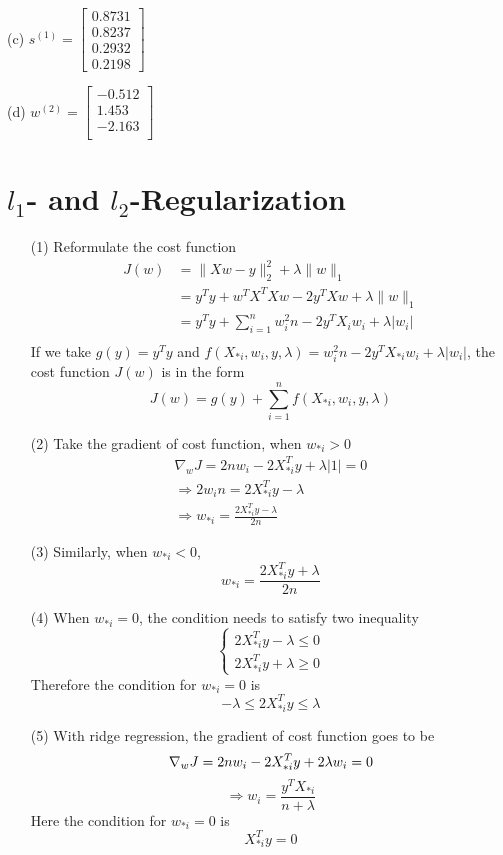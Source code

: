 \documentclass[a4paper,12pt]{article}
\begin{document}
\begin{itemize}
\subitem (c) 
$s^{(1)} = \left [ \begin{array}{c}
0.8731\\
0.8237 \\
0.2932 \\
0.2198
\end{array} \right ] $

\subitem (d) 
$w^{(2)} = \left [ \begin{array}{c}
-0.512\\
1.453 \\
-2.163 \\
\end{array} \right ] $
\end{itemize}




\clearpage
\section{$l_1$- and $l_2$-Regularization}
\begin{itemize}
\item[(1)]
Reformulate the cost function
\begin{align*}
J(w) &= \| X w - y \|_2^2 + \lambda \|w \|_1 \\
	  &= y^T y + w^T X^T X w - 2y^T X w + \lambda \|w\|_1\\
	  &= y^T y + \sum_{i=1}^n w_i^2 n - 2y^T X_i w_i + \lambda  |w_i| \\
\end{align*}
If we take $g(y) = y^T y$ and $f(X_{*i},w_i,y,\lambda) = w_i^2 n - 2y^T X_{*i} w_i + \lambda |w_i| $, the cost function $J(w)$ is in the form
$$
J(w) = g(y) + \sum_{i=1}^n f(X_{*i},w_i,y,\lambda)
$$

\clearpage
\item[(2)]
Take the gradient of cost function, when $w_{*i} > 0$
\begin{align*}
\nabla_w J = 2 n w_i - 2 X_{*i}^T y + \lambda |1| = 0 \\
\Rightarrow 2w_i n = 2 X_{*i}^T y - \lambda \\
\Rightarrow w_{*i} = \frac{2 X_{*i}^T y - \lambda}{2n}
\end{align*}

\clearpage
\item[(3)]
Similarly, when $w_{*i} < 0$, 
$$
w_{*i} = \frac{2 X_{*i}^T y + \lambda}{2n}
$$


\clearpage
\item[(4)]
When $w_{*i} = 0$, the condition needs to satisfy two inequality
$$\begin{cases}
2 X_{*i}^T y - \lambda \le 0 \\
2 X_{*i}^T y + \lambda \ge 0
\end{cases}$$
Therefore the condition for $w_{*i} = 0$ is
$$
-\lambda \le 2 X_{*i}^T y \le \lambda
$$


\clearpage
\item[(5)]
With ridge regression, the gradient of cost function goes to be
$$
\nabla_w J = 2 n w_i - 2 X_{*i}^T y + 2 \lambda w_i = 0 \\
$$
$$
\Rightarrow w_i = \frac{y^T X_{*i}}{n + \lambda}
$$
Here the condition for $w_{*i} = 0$ is
$$
X_{*i}^T y = 0
$$
\end{itemize}
\end{document}
